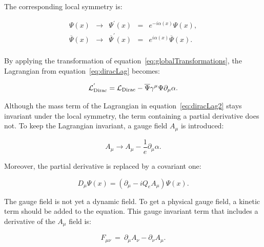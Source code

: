       The corresponding local symmetry is:

      \begin{equation}
            \begin{array}{rcccr}
             \Psi\left(x\right) & \rightarrow & \Psi^{'} \left(x \right) & = & e^{-i\alpha(x)} \Psi\left(x\right), \\
             \overline{\Psi}\left(x\right) & \rightarrow & \overline{\Psi}^{'}\left(x\right) & = & e^{i\alpha(x)}  \overline{\Psi}\left(x\right). \\
            \end{array}
        \label{eq:localTransformations}
      \end{equation}

      By applying the transformation of equation~\ref{eq:globalTransformations}, the Lagrangian from equation~\ref{eq:diracLag} becomes:

      \begin{equation}
        \mathcal{L}^{'}_{\rm{Dirac}} = \mathcal{L}_{\rm{Dirac}} - \overline{\Psi} \gamma^{\mu} \Psi \partial_{\mu} \alpha.
        \label{eq:diracLag2}
      \end{equation}
      
      Although the mass term of the Lagrangian in equation~\ref{eq:diracLag2} stays invariant under the local symmetry, the term containing a partial derivative does not.
      To keep the Lagrangian invariant, a gauge field $A_{\mu}$ is introduced:

      \begin{equation}
        A_{\mu} \rightarrow A_{\mu} - \frac{1}{e} \partial_{\mu} \alpha.
      \end{equation}

      Moreover, the partial derivative is replaced by a covariant one:

      \begin{equation}
        D_{\mu} \Psi\left(x\right) =  \left(\partial_{\mu} - i Q_e A_{\mu}\right) \Psi\left(x\right).
      \end{equation}

      The gauge field is not yet a dynamic field. 
      To get a physical gauge field, a kinetic term should be added to the equation.
      This gauge invariant term that includes a derivative of the $A_{\mu}$ field is:
    
      \begin{equation}
        F_{\mu \nu} \ = \ \partial_\mu A_\nu - \partial_\nu A_\mu.
      \end{equation}

